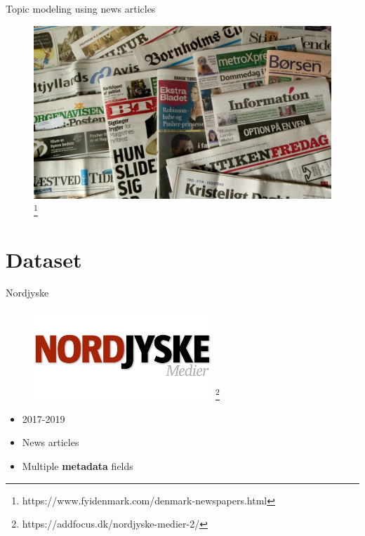 \begin{frame}{\insertsection}{Topic modeling using news articles}
	\begin{figure}
		\includegraphics[width=\textwidth]{figures/danish_newspapers.jpg}
		\let\thefootnote\relax\footnote{\tiny{https://www.fyidenmark.com/denmark-newspapers.html}}
	\end{figure}
\end{frame}

\section{Dataset}

\begin{frame}{\insertsection}{Nordjyske}
	\begin{figure}
		\includegraphics[width=0.6\textwidth]{figures/nordjyske-medier.png}
		\let\thefootnote\relax\footnote{\tiny{https://addfocus.dk/nordjyske-medier-2/}}
	\end{figure}
	\begin{itemize}
		\item 2017-2019
		\item News articles
		\item Multiple \textbf<2>{metadata} fields
	\end{itemize}
\end{frame}


